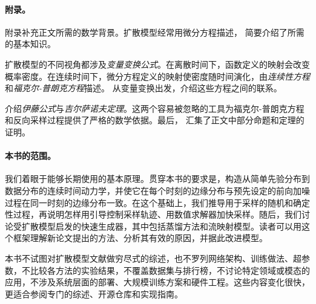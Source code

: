 \paragraph{附录。}
附录补充正文所需的数学背景。扩散模型经常用微分方程描述， 简要介绍了所需的基本知识。

扩散模型的不同视角都涉及\emph{变量变换公式}。在离散时间下，函数定义的映射会改变概率密度。在连续时间下，微分方程定义的映射使密度随时间演化，由\emph{连续性方程}和\emph{福克尔-普朗克方程}描述。 从变量变换出发，介绍这些方程之间的联系。

 介绍\emph{伊藤公式}与\emph{吉尔萨诺夫定理}。这两个容易被忽略的工具为福克尔-普朗克方程和反向采样过程提供了严格的数学依据。最后， 汇集了正文中部分命题和定理的证明。

\paragraph{本书的范围。}
我们着眼于能够长期使用的基本原理。贯穿本书的要求是，构造从简单先验分布到数据分布的连续时间动力学，并使它在每个时刻的边缘分布与预先设定的前向加噪过程在同一时刻的边缘分布一致。在这个基础上，我们推导用于采样的随机和确定性过程，再说明怎样用引导控制采样轨迹、用数值求解器加快采样。随后，我们讨论受扩散模型启发的快速生成器，其中包括蒸馏方法和流映射模型。读者可以用这个框架理解新论文提出的方法、分析其有效的原因，并据此改进模型。

本书不试图对扩散模型文献做穷尽式的综述，也不罗列网络架构、训练做法、超参数，不比较各方法的实验结果，不覆盖数据集与排行榜，不讨论特定领域或模态的应用，不涉及系统层面的部署、大规模训练方案和硬件工程。这些内容变化很快，更适合参阅专门的综述、开源仓库和实现指南。
